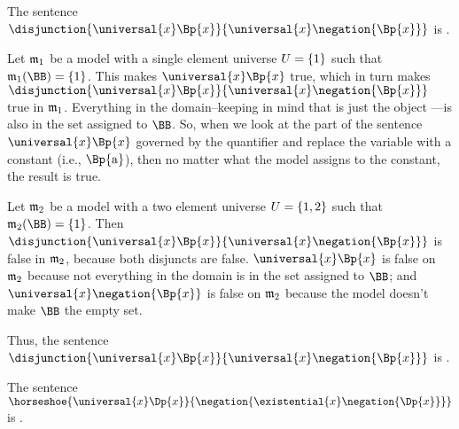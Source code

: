 \begin{majorILnc}{}
	The sentence $\disjunction{\universal{\variable{x}}\Bp{\variable{x}}}{\universal{\variable{x}}\negation{\Bp{\variable{x}}}}$ is .
\end{majorILnc}
\begin{PROOF}
Let $\mathfrak{m}_1$ be a model with a single element universe $U=\{1\}$ such that $\IntA_1(\BB)=\{1\}$. 
This makes $\universal{\variable{x}}\Bp{\variable{x}}$ true, which in turn makes $\disjunction{\universal{\variable{x}}\Bp{\variable{x}}}{\universal{\variable{x}}\negation{\Bp{\variable{x}}}}$ true in $\mathfrak{m}_1$.  Everything in the domain--keeping in mind that  is just the object ---is also in the set assigned to $\BB$.  So, when we look at the part of the sentence $\universal{\variable{x}}\Bp{\variable{x}}$ governed by the quantifier and replace the variable with a constant (i.e., $\Bp{\constant{a}}$), then no matter what the model assigns to the constant, the result is true.

Let $\mathfrak{m}_2$ be a model with a two element universe $U=\{1,2\}$ such that $\IntA_2(\BB)=\{1\}$.
Then $\disjunction{\universal{\variable{x}}\Bp{\variable{x}}}{\universal{\variable{x}}\negation{\Bp{\variable{x}}}}$ is false in $\mathfrak{m}_2$, because both disjuncts are false.  $\universal{\variable{x}}\Bp{\variable{x}}$ is false on $\mathfrak{m}_2$ because not everything in the domain is in the set assigned to $\BB$; and $\universal{\variable{x}}\negation{\Bp{\variable{x}}}$ is false on $\mathfrak{m}_2$ because the model doesn't make $\BB$ the empty set.

Thus, the sentence $\disjunction{\universal{\variable{x}}\Bp{\variable{x}}}{\universal{\variable{x}}\negation{\Bp{\variable{x}}}}$ is .
\end{PROOF}
\begin{majorILnc}{}
The sentence $\horseshoe{\universal{\variable{x}}\Dp{\variable{x}}}{\negation{\existential{\variable{x}}\negation{\Dp{\variable{x}}}}}$ is .
\end{majorILnc}
